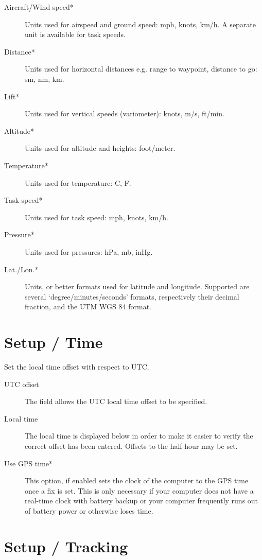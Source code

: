 \begin{description}
\item[Aircraft/Wind speed*]  Units used for airspeed and ground speed: mph, 
  knots, km/h. A separate unit is available for task speeds.
\item[Distance*]  Units used for horizontal distances e.g. range to waypoint, 
  distance to go: sm, nm, km.
\item[Lift*]  Units used for vertical speeds (variometer): knots, m/s, ft/min.
\item[Altitude*] Units used for altitude and heights: foot/meter.
\item[Temperature*]  Units used for temperature: \degree C, \degree F.
\item[Task speed*] Units used for task speed: mph, knots, km/h.
\item[Pressure*]  Units used for pressures: hPa, mb, inHg.
\item[Lat./Lon.*]  Units, or better formats used for latitude and longitude. 
  Supported are several `degree/minutes/seconds' formats, respectively 
  their decimal fraction, and the  UTM WGS 84 format.
\end{description}


\section{Setup / Time}

Set the local time offset with respect to UTC.

\begin{description}
\item[UTC offset]  The field allows the UTC local time offset to be specified.
\item[Local time]  The local time is displayed below in order to make it easier to verify
  the correct offset has been entered.  Offsets to the half-hour may be set.
\item[Use GPS time*] This option, if enabled sets the clock of the computer to 
  the GPS time once a fix is set. This is only necessary if your computer does 
  not have a real-time clock with battery backup or your computer 
  frequently runs out of battery power or otherwise loses time.
\end{description}


\section{Setup / Tracking}

